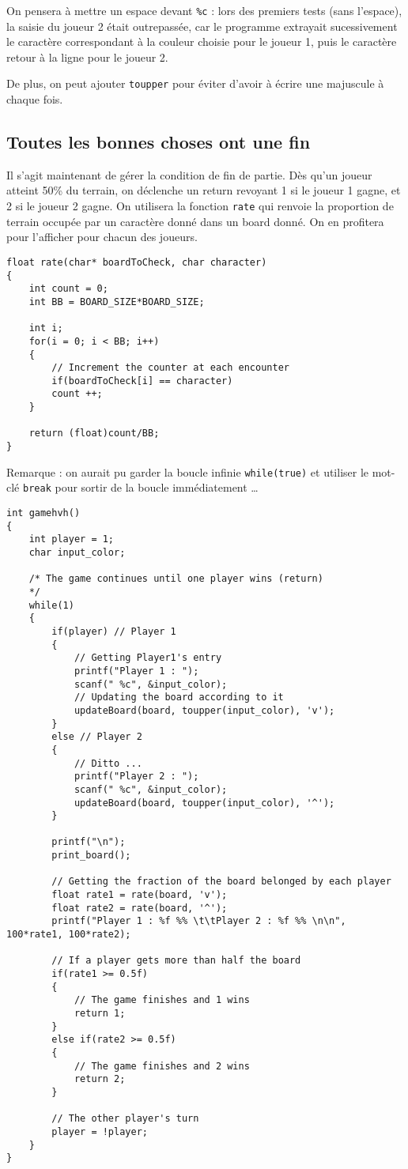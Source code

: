 \documentclass[a4paper,11pt]{article}
\begin{document}
	On pensera \`a mettre un espace devant \texttt{\%c} : lors des premiers tests (sans l'espace), la saisie du joueur 2 \'etait outrepass\'ee, car le programme extrayait sucessivement le caract\`ere correspondant \`a la couleur choisie pour le joueur 1, puis le caract\`ere \guillemotleft retour \`a la ligne \guillemotright pour le joueur 2.
	
	De plus, on peut ajouter \texttt{toupper} pour \'eviter d'avoir \`a \'ecrire une majuscule \`a chaque fois.
	
	
	\subsection{Toutes les bonnes choses ont une fin}
	
	Il s'agit maintenant de gérer la condition de fin de partie. D\`es qu'un joueur atteint 50\% du terrain, on d\'eclenche un return revoyant 1 si le joueur 1 gagne, et 2 si le joueur 2 gagne. On utilisera la fonction \texttt{rate} qui renvoie la proportion de terrain occup\'ee par un caract\`ere donn\'e dans un board donn\'e. On en profitera pour l'afficher pour chacun des joueurs.
	
	\begin{lstlisting}
float rate(char* boardToCheck, char character)
{
	int count = 0;
	int BB = BOARD_SIZE*BOARD_SIZE;
	
	int i;
	for(i = 0; i < BB; i++)
	{
		// Increment the counter at each encounter
		if(boardToCheck[i] == character)
		count ++;
	}
	
	return (float)count/BB;
}\end{lstlisting}
	
	Remarque : on aurait pu garder la boucle infinie \texttt{while(true)} et utiliser le mot-clé \texttt{break} pour sortir de la boucle immédiatement \dots
	
	\begin{lstlisting}
int gamehvh()
{
	int player = 1;
	char input_color;
	
	/* The game continues until one player wins (return)
	*/
	while(1)
	{
		if(player) // Player 1
		{
			// Getting Player1's entry
			printf("Player 1 : ");
			scanf(" %c", &input_color);
			// Updating the board according to it
			updateBoard(board, toupper(input_color), 'v');
		}
		else // Player 2
		{
			// Ditto ...
			printf("Player 2 : ");
			scanf(" %c", &input_color);
			updateBoard(board, toupper(input_color), '^');
		}
		
		printf("\n");
		print_board();
		
		// Getting the fraction of the board belonged by each player
		float rate1 = rate(board, 'v');
		float rate2 = rate(board, '^');
		printf("Player 1 : %f %% \t\tPlayer 2 : %f %% \n\n", 100*rate1, 100*rate2);
		
		// If a player gets more than half the board
		if(rate1 >= 0.5f)
		{
			// The game finishes and 1 wins
			return 1;
		}
		else if(rate2 >= 0.5f)
		{
			// The game finishes and 2 wins
			return 2;
		}
		
		// The other player's turn
		player = !player;
	}
}\end{lstlisting}
	
\end{document}
